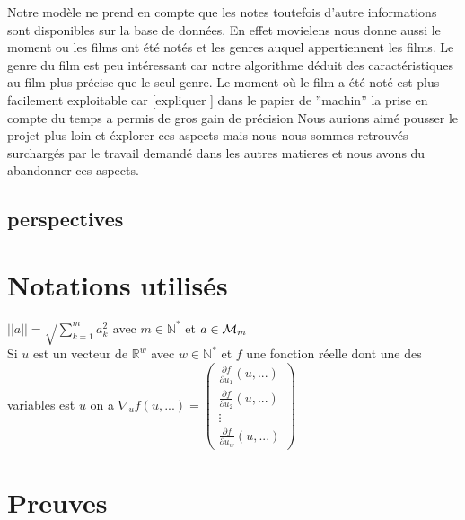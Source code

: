 \documentclass[a4paper,10pt]{article}
\begin{document}
Notre modèle ne prend en compte que les notes toutefois d'autre informations sont disponibles sur la base de données.
En effet movielens nous donne aussi le moment ou les films ont été notés et les genres auquel appertiennent les films.
Le genre du film est peu intéressant car notre algorithme déduit des caractéristiques au film plus précise que le seul genre.%
Le moment où le film a été noté est plus facilement exploitable car [expliquer ] dans le papier de ''machin'' la prise en compte  du temps a
permis de gros gain de précision%
Nous aurions aimé pousser le projet plus loin et éxplorer ces aspects 
mais nous nous sommes retrouvés surchargés par le travail demandé dans les autres matieres et nous avons du abandonner ces aspects.


\subsection{perspectives}
\appendix
\section{Notations utilisés}

$||a|| = \sqrt{\sum_{k = 1}^{m} a_{k}^{2}}$ avec $m \in \mathbb{N}^*$ et $a \in {\cal M}_{m}$\\

Si $u$ est un vecteur de $\mathbb{R}^w$ avec $w \in \mathbb{N}^*$ et $f$ une fonction réelle dont une des variables est $u$ on a 
$\nabla_{u} f(u, ...) =
\begin{pmatrix}
\frac{\partial f}{\partial u_{1}}(u, ...)\\
\frac{\partial f}{\partial u_{2}}(u, ...)\\
\vdots\\
\frac{\partial f}{\partial u_{w}}(u, ...)
\end{pmatrix}$ 
\section{Preuves}
\end{document}
